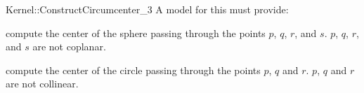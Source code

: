 \begin{ccRefFunctionObjectConcept}{Kernel::ConstructCircumcenter_3}
A model for this must provide:


 {compute the center of the sphere passing through the points $p$, $q$, $r$,
  and $s$.  \ccPrecond $p$, $q$, $r$, and $s$ are not coplanar.}

{compute the center of the circle passing through the points $p$, $q$ and $r$.
  \ccPrecond $p$, $q$ and $r$ are not collinear.}

\ccSeeAlso
{} \\

\end{ccRefFunctionObjectConcept}
